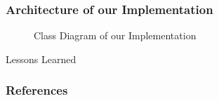 \documentclass{beamer}
\begin{document}
\begin{frame}
\frametitle{Architecture of our Implementation}
\begin{figure}[htp] 
\caption{Class Diagram of our Implementation}
\end{figure}  
\end{frame}

\begin{frame}{Lessons Learned}
\end{frame} 

\begin{frame}[t,allowframebreaks]
	\frametitle{References}
	\printbibliography
\end{frame}
\end{document}
